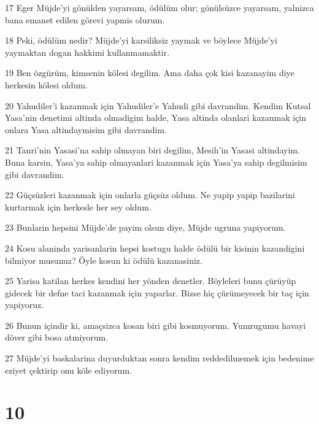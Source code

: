 \par 17 Eger Müjde'yi gönülden yayarsam, ödülüm olur; gönülsüzce yayarsam, yalnizca bana emanet edilen görevi yapmis olurum.
\par 18 Peki, ödülüm nedir? Müjde'yi karsiliksiz yaymak ve böylece Müjde'yi yaymaktan dogan hakkimi kullanmamaktir.
\par 19 Ben özgürüm, kimsenin kölesi degilim. Ama daha çok kisi kazanayim diye herkesin kölesi oldum.
\par 20 Yahudiler'i kazanmak için Yahudiler'e Yahudi gibi davrandim. Kendim Kutsal Yasa'nin denetimi altinda olmadigim halde, Yasa altinda olanlari kazanmak için onlara Yasa altindaymisim gibi davrandim.
\par 21 Tanri'nin Yasasi'na sahip olmayan biri degilim, Mesih'in Yasasi altindayim. Buna karsin, Yasa'ya sahip olmayanlari kazanmak için Yasa'ya sahip degilmisim gibi davrandim.
\par 22 Güçsüzleri kazanmak için onlarla güçsüz oldum. Ne yapip yapip bazilarini kurtarmak için herkesle her sey oldum.
\par 23 Bunlarin hepsini Müjde'de payim olsun diye, Müjde ugruna yapiyorum.
\par 24 Kosu alaninda yarisanlarin hepsi kostugu halde ödülü bir kisinin kazandigini bilmiyor musunuz? Öyle kosun ki ödülü kazanasiniz.
\par 25 Yarisa katilan herkes kendini her yönden denetler. Böyleleri bunu çürüyüp gidecek bir defne taci kazanmak için yaparlar. Bizse hiç çürümeyecek bir taç için yapiyoruz.
\par 26 Bunun içindir ki, amaçsizca kosan biri gibi kosmuyorum. Yumrugumu havayi döver gibi bosa atmiyorum.
\par 27 Müjde'yi baskalarina duyurduktan sonra kendim reddedilmemek için bedenime eziyet çektirip onu köle ediyorum.

\chapter{10}

